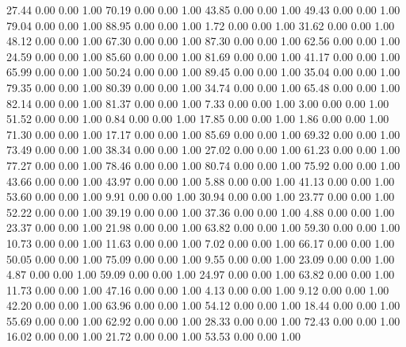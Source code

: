    27.44   0.00   0.00   1.00
   70.19   0.00   0.00   1.00
   43.85   0.00   0.00   1.00
   49.43   0.00   0.00   1.00
   79.04   0.00   0.00   1.00
   88.95   0.00   0.00   1.00
    1.72   0.00   0.00   1.00
   31.62   0.00   0.00   1.00
   48.12   0.00   0.00   1.00
   67.30   0.00   0.00   1.00
   87.30   0.00   0.00   1.00
   62.56   0.00   0.00   1.00
   24.59   0.00   0.00   1.00
   85.60   0.00   0.00   1.00
   81.69   0.00   0.00   1.00
   41.17   0.00   0.00   1.00
   65.99   0.00   0.00   1.00
   50.24   0.00   0.00   1.00
   89.45   0.00   0.00   1.00
   35.04   0.00   0.00   1.00
   79.35   0.00   0.00   1.00
   80.39   0.00   0.00   1.00
   34.74   0.00   0.00   1.00
   65.48   0.00   0.00   1.00
   82.14   0.00   0.00   1.00
   81.37   0.00   0.00   1.00
    7.33   0.00   0.00   1.00
    3.00   0.00   0.00   1.00
   51.52   0.00   0.00   1.00
    0.84   0.00   0.00   1.00
   17.85   0.00   0.00   1.00
    1.86   0.00   0.00   1.00
   71.30   0.00   0.00   1.00
   17.17   0.00   0.00   1.00
   85.69   0.00   0.00   1.00
   69.32   0.00   0.00   1.00
   73.49   0.00   0.00   1.00
   38.34   0.00   0.00   1.00
   27.02   0.00   0.00   1.00
   61.23   0.00   0.00   1.00
   77.27   0.00   0.00   1.00
   78.46   0.00   0.00   1.00
   80.74   0.00   0.00   1.00
   75.92   0.00   0.00   1.00
   43.66   0.00   0.00   1.00
   43.97   0.00   0.00   1.00
    5.88   0.00   0.00   1.00
   41.13   0.00   0.00   1.00
   53.60   0.00   0.00   1.00
    9.91   0.00   0.00   1.00
   30.94   0.00   0.00   1.00
   23.77   0.00   0.00   1.00
   52.22   0.00   0.00   1.00
   39.19   0.00   0.00   1.00
   37.36   0.00   0.00   1.00
    4.88   0.00   0.00   1.00
   23.37   0.00   0.00   1.00
   21.98   0.00   0.00   1.00
   63.82   0.00   0.00   1.00
   59.30   0.00   0.00   1.00
   10.73   0.00   0.00   1.00
   11.63   0.00   0.00   1.00
    7.02   0.00   0.00   1.00
   66.17   0.00   0.00   1.00
   50.05   0.00   0.00   1.00
   75.09   0.00   0.00   1.00
    9.55   0.00   0.00   1.00
   23.09   0.00   0.00   1.00
    4.87   0.00   0.00   1.00
   59.09   0.00   0.00   1.00
   24.97   0.00   0.00   1.00
   63.82   0.00   0.00   1.00
   11.73   0.00   0.00   1.00
   47.16   0.00   0.00   1.00
    4.13   0.00   0.00   1.00
    9.12   0.00   0.00   1.00
   42.20   0.00   0.00   1.00
   63.96   0.00   0.00   1.00
   54.12   0.00   0.00   1.00
   18.44   0.00   0.00   1.00
   55.69   0.00   0.00   1.00
   62.92   0.00   0.00   1.00
   28.33   0.00   0.00   1.00
   72.43   0.00   0.00   1.00
   16.02   0.00   0.00   1.00
   21.72   0.00   0.00   1.00
   53.53   0.00   0.00   1.00
